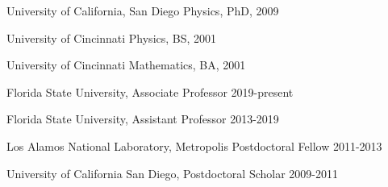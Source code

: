 

\noindent
University of California, San Diego \hfill Physics, PhD, 2009

\noindent
University of Cincinnati \hfill Physics, BS, 2001

\noindent
University of Cincinnati \hfill Mathematics, BA, 2001

\medskip


\noindent
Florida State University, Associate Professor \hfill 2019-present

\noindent
Florida State University, Assistant Professor \hfill 2013-2019

\noindent
Los Alamos National Laboratory, Metropolis Postdoctoral Fellow \hfill 2011-2013

\noindent
University of California San Diego, Postdoctoral Scholar \hfill 2009-2011

